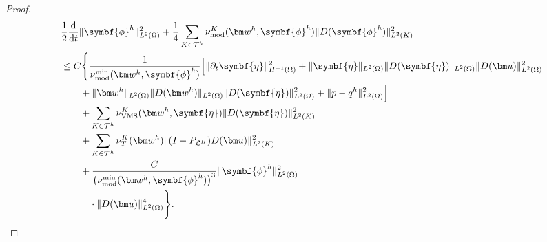 \begin{proof}
\begin{equation}\label{eq:vms-coarse-projection-error-differential-inequality}
\begin{aligned}
 &\frac12\frac{\mathrm d}{\mathrm dt}
      \|\symbf{\phi}^h\|_{L^2(\Omega)}^2
  +\frac14\sum_{K\in\mathcal T^h}
      \nu_{\mathrm{mod}}^K(\bm w^h,\symbf{\phi}^h)
      \|D(\symbf{\phi}^h)\|_{L^2(K)}^2\\
 &\le C\Biggl\{\frac{1}{\nu_{\mathrm{mod}}^{\min}
       (\bm w^h,\symbf{\phi}^h)}
      \Bigl[\|\partial_t\symbf{\eta}\|_{H^{-1}(\Omega)}^2
       +\|\symbf{\eta}\|_{L^2(\Omega)}
        \|D(\symbf{\eta})\|_{L^2(\Omega)}
        \|D(\bm u)\|_{L^2(\Omega)}^2\\
 &\qquad+\|\bm w^h\|_{L^2(\Omega)}
        \|D(\bm w^h)\|_{L^2(\Omega)}
        \|D(\symbf{\eta})\|_{L^2(\Omega)}^2
       +\|p-q^h\|_{L^2(\Omega)}^2\Bigr]\\
 &\qquad+\sum_{K\in\mathcal T^h}
       \nu_{\mathrm{VMS}}^K(\bm w^h,\symbf{\eta})
       \|D(\symbf{\eta})\|_{L^2(K)}^2\\
 &\qquad+\sum_{K\in\mathcal T^h}\nu_T^K(\bm w^h)
       \|(I-P_{\mathcal L^H})D(\bm u)\|_{L^2(K)}^2\\
 &\qquad+\frac{C}{\bigl(\nu_{\mathrm{mod}}^{\min}
       (\bm w^h,\symbf{\phi}^h)\bigr)^3}
       \|\symbf{\phi}^h\|_{L^2(\Omega)}^2\\
 &\qquad\quad\cdot\|D(\bm u)\|_{L^2(\Omega)}^4\Biggr\}.
\end{aligned}
\end{equation}


\end{proof}
